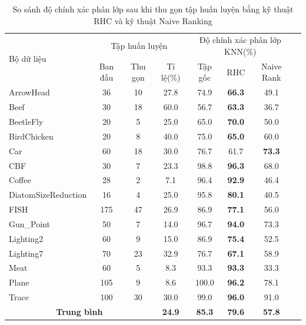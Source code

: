 \documentclass[13pt,oneside]{scrbook}
\begin{document}
\begin{table}[!htb]
\centering
    \begin{tabular}{| l | c | c | c | c | c | c | c |}
    \hline
	\multirow{2}{*}{Bộ dữ liệu} & \multicolumn{3}{c|}{Tập huấn luyện}& \multicolumn{3}{c|}{Độ chính xác phân lớp KNN(\%)}\\
	\cline{2-7}
    & Ban đầu & Thu gọn & Tỉ lệ(\%) & Tập gốc &  RHC &Naive Rank\\
	\hline
ArrowHead & 36 & 10 & 27.8 & 74.9 & \textbf{66.3} & 49.1\\ \hline
Beef & 30 & 18 & 60.0 & 56.7 & \textbf{63.3} & 36.7\\ \hline
BeetleFly & 20 & 5 & 25.0 & 65.0 & \textbf{70.0} & 50.0\\ \hline
BirdChicken & 20 & 8 & 40.0 & 75.0 & \textbf{65.0} & 60.0\\ \hline
Car & 60 & 18 & 30.0 & 76.7 & 61.7 & \textbf{73.3}\\ \hline
CBF & 30 & 7 & 23.3 & 98.8 & \textbf{96.3} & 68.0\\ \hline
Coffee & 28 & 2 & 7.1 & 96.4 & \textbf{92.9} & 46.4\\ \hline
DiatomSizeReduction & 16 & 4 & 25.0 & 95.8 & \textbf{80.1} & 40.5\\ \hline
FISH & 175 & 47 & 26.9 & 86.9 & \textbf{77.1} & 56.0\\ \hline
Gun\_Point & 50 & 7 & 14.0 & 96.7 & \textbf{94.0} & 73.3\\ \hline
Lighting2 & 60 & 9 & 15.0 & 86.9 & \textbf{75.4} & 52.5\\ \hline
Lighting7 & 70 & 23 & 32.9 & 76.7 & \textbf{67.1} & 58.9\\ \hline
Meat & 60 & 5 & 8.3 & 93.3 & \textbf{93.3} & 33.3\\ \hline
Plane & 105 & 9 & 8.6 & 100.0 & \textbf{96.2} & 78.1\\ \hline
Trace & 100 & 30 & 30.0 & 99.0 & \textbf{96.0} & 91.0\\ \hline
\multicolumn{3}{|c|}{\textbf{Trung bình}} & \textbf{24.9} & \textbf{85.3} & \textbf{79.6} & \textbf{57.8}\\ \hline
    \end{tabular}
    \caption{So sánh độ chính xác phân lớp sau khi thu gọn tập huấn luyện bằng kỹ thuật RHC và kỹ thuật Naive Ranking}\label{tab:classificationresult}
\end{table}
\end{document}

